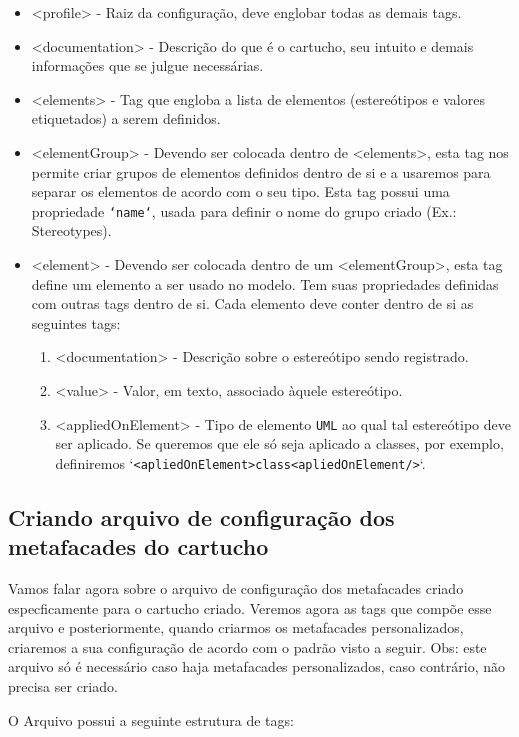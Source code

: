 \begin{enumerate}
\begin{itemize}
  \item <profile> - Raiz da configuração, deve englobar todas as demais tags.
  \item <documentation> - Descrição do que é o cartucho, seu intuito e demais
  informações que se julgue necessárias.
  \item <elements> - Tag que engloba a lista de elementos (estereótipos e
  valores etiquetados) a serem definidos.
  \item <elementGroup> - Devendo ser colocada dentro de <elements>, esta tag
  nos permite criar grupos de elementos definidos dentro de si e a usaremos para
  separar os elementos de acordo com o seu tipo. Esta tag possui uma propriedade
  \texttt{`name`}, usada para definir o nome do grupo criado (Ex.: Stereotypes).
  \item <element> - Devendo ser colocada dentro de um <elementGroup>, esta tag
  define um elemento a ser usado no modelo. Tem suas propriedades definidas com
  outras tags dentro de si. Cada elemento deve conter dentro de si as seguintes
  tags:
  \begin{enumerate}
    \item <documentation> - Descrição sobre o estereótipo sendo registrado.
    \item <value> - Valor, em texto, associado àquele estereótipo.
    \item <appliedOnElement> - Tipo de elemento \texttt{UML} ao qual tal
    estereótipo deve ser aplicado. Se queremos que ele só seja aplicado a
    classes, por exemplo, definiremos 
    `\texttt{<apliedOnElement>class<apliedOnElement/>}`.
  \end{enumerate}
\end{itemize}

\subsection{Criando arquivo de configuração dos metafacades do cartucho}
Vamos falar agora sobre o arquivo de configuração dos metafacades criado
especficamente para o cartucho criado. Veremos agora as tags que compõe esse
arquivo e posteriormente, quando criarmos os metafacades personalizados,
criaremos a sua configuração de acordo com o padrão visto a seguir. Obs: este
arquivo só é necessário caso haja metafacades personalizados, caso contrário,
não precisa ser criado.

O Arquivo possui a seguinte estrutura de tags:


\end{enumerate}
